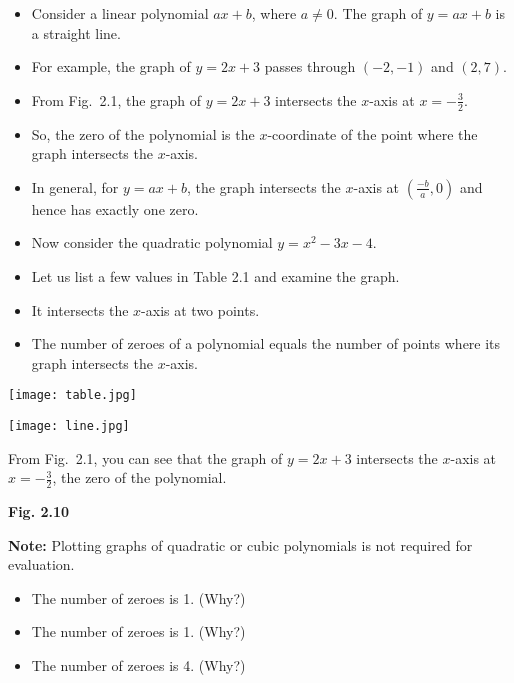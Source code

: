 \documentclass[12pt]{article}
\begin{document}
\begin{itemize}
  \item Consider a linear polynomial $ax + b$, where $a \ne 0$. The graph of $y = ax + b$ is a straight line.
  \item For example, the graph of $y = 2x + 3$ passes through $(-2, -1)$ and $(2, 7)$.
  \item From Fig.~2.1, the graph of $y = 2x + 3$ intersects the $x$-axis at $x = -\frac{3}{2}$.
  \item So, the zero of the polynomial is the $x$-coordinate of the point where the graph intersects the $x$-axis.
  \item In general, for $y = ax + b$, the graph intersects the $x$-axis at $\left( \frac{-b}{a}, 0 \right)$ and hence has exactly one zero.
  \item Now consider the quadratic polynomial $y = x^2 - 3x - 4$.
  \item Let us list a few values in Table 2.1 and examine the graph.
  \item It intersects the $x$-axis at two points.
  \item The number of zeroes of a polynomial equals the number of points where its graph intersects the $x$-axis.
\end{itemize}

\texttt{[image: table.jpg]}
\begin{flushright}
    \vspace{-9em}\texttt{[image: line.jpg]} 
\end{flushright}

\vspace{-13em}
\hspace{2em}From Fig.~2.1, you can see that the graph of $y = 2x + 3$ intersects the $x$-axis at $x = -\frac{3}{2}$, the zero of the polynomial.

\vspace{-5.7em}
\begin{center}
\textcolor{myblue}{\textbf{Fig. 2.10}}
\end{center}

\textbf{Note:} Plotting graphs of quadratic or cubic polynomials is not required for evaluation.

\begin{itemize}
  \item The number of zeroes is 1. (Why?)
  \item The number of zeroes is 1. (Why?)
  \item The number of zeroes is 4. (Why?)
\end{itemize}
\end{document}
